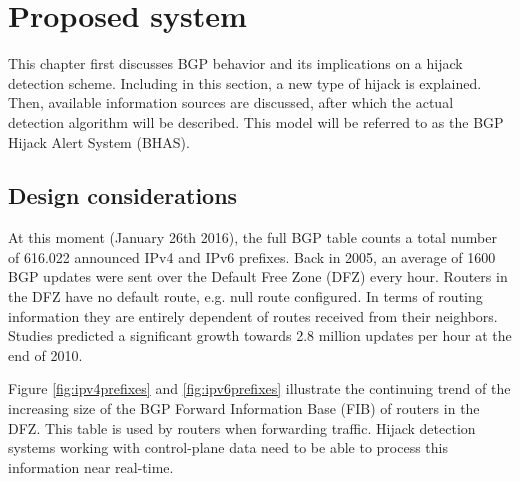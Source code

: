 \chapter{Proposed system}\label{ch:model}
This chapter first discusses BGP behavior and its implications on a hijack detection scheme. Including in this section, a new type of hijack is explained. Then, available information sources are discussed, after which the actual detection algorithm will be described. This model will be referred to as the BGP Hijack Alert System (BHAS).

\section{Design considerations}\label{sec:sourcesofinformation}
At this moment (January 26th 2016), the full BGP table counts a total number of 616.022 announced IPv4\cite{ipv4report} and IPv6\cite{ipv6report} prefixes. Back in 2005, an average of 1600 BGP updates were sent over the Default Free Zone (DFZ) every hour\cite{huston2006projecting}. Routers in the DFZ have no default route, e.g. null route configured\cite{berkowitz2005terminology}. In terms of routing information they are entirely dependent of routes received from their neighbors. Studies predicted a significant growth towards 2.8 million updates per hour at the end of 2010\cite{huston2006projecting}.\par
Figure \ref{fig:ipv4prefixes} and \ref{fig:ipv6prefixes} illustrate the continuing trend of the increasing size of the BGP Forward Information Base (FIB) of routers in the DFZ. This table is used by routers when forwarding traffic\cite{berkowitz2005terminology}. Hijack detection systems working with control-plane data need to be able to process this information near real-time.\\\par
